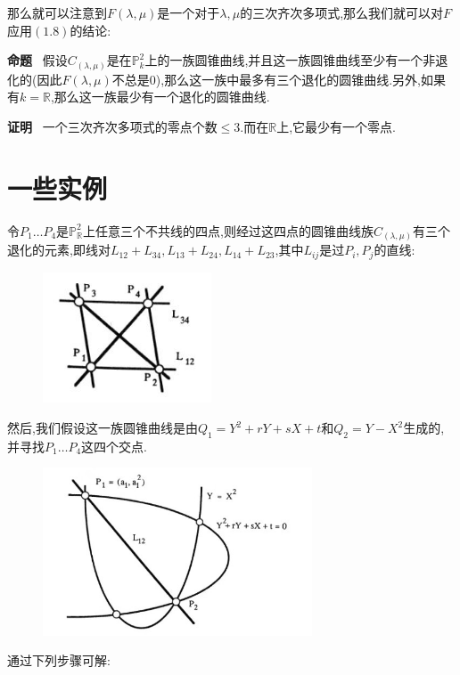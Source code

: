 \documentclass[UTF8]{book}
\begin{document}
		
		那么就可以注意到$F(\lambda, \mu)$是一个对于$\lambda, \mu$的三次齐次多项式,那么我们就可以对$F$应用$(1.8)$的结论:
		
	
		\textbf{命题} \ 假设$C_{(\lambda, \mu)}$是在$\mathbb{P}^{2}_{k}$上的一族圆锥曲线,并且这一族圆锥曲线至少有一个非退化的(因此$F(\lambda, \mu)$不总是0),那么这一族中最多有三个退化的圆锥曲线.另外,如果有$k=\mathbb{R}$,那么这一族最少有一个退化的圆锥曲线.
		
		
		\textbf{证明} \ 一个三次齐次多项式的零点个数$\leq 3$.而在$\mathbb{R}$上,它最少有一个零点.

	\section{一些实例}
		令$P_{1} \ldots P_{4}$是$\mathbb{P}^{2}_{\mathbb{R}}$上任意三个不共线的四点,则经过这四点的圆锥曲线族$C_{(\lambda, \mu)}$有三个退化的元素,即线对$L_{12}+L_{34}, L_{13}+L_{24}, L_{14}+L_{23}$,其中$L_{ij}$是过$P_{i},P_{j}$的直线:
		\begin{figure}[H]
		  \centering
		  \includegraphics[width=5cm]{22.jpg}
		\end{figure}
	
	
		{然后,我们假设这一族圆锥曲线是由$Q_{1}=Y^{2}+r Y+s X+t$和$Q_{2}=Y-X^{2}$生成的,并寻找$P_{1} \ldots P_{4}$这四个交点.}
		
		\begin{figure}[H]
		  \centering
		  \includegraphics[width=8cm]{23.jpg}
		\end{figure}
	
	
		通过下列步骤可解:
		
\end{document}

